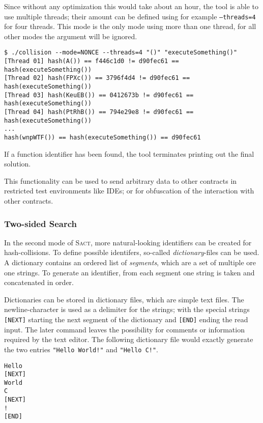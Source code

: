 Since without any optimization this would take about an hour, the tool is able to use multiple threads; their amount can be defined using for example \texttt{--threads=4} for four threads. This mode is the only mode using more than one thread, for all other modes the argument will be ignored.

\begin{verbatim}
$ ./collision --mode=NONCE --threads=4 "()" "executeSomething()"
[Thread 01] hash(A()) == f446c1d0 != d90fec61 == hash(executeSomething())
[Thread 02] hash(FPXc()) == 3796f4d4 != d90fec61 == hash(executeSomething())
[Thread 03] hash(KeuEB()) == 0412673b != d90fec61 == hash(executeSomething())
[Thread 04] hash(PtRhB()) == 794e29e8 != d90fec61 == hash(executeSomething())
...
hash(wnpWTF()) == hash(executeSomething()) == d90fec61
\end{verbatim}

If a function identifier has been found, the tool terminates printing out the final solution.

This functionality can be used to send arbitrary data to other contracts in restricted test environments like IDEs; or for obfuscation of the interaction with other contracts.

\subsubsection{Two-sided Search}
In the second mode of \textsc{Sact}, more natural-looking identifiers can be created for hash-collisions. To define possible identifers, so-called \textit{dictionary}-files can be used. A dictionary contains an ordered list of \textit{segments}, which are a set of multiple ore one strings. To generate an identifier, from each segment one string is taken and concatenated in order.

Dictionaries can be stored in dictionary files, which are simple text files. The newline-character is used as a delimiter for the strings; with the special strings \texttt{[NEXT]} starting the next segment of the dictionary and \texttt{[END]} ending the read input. The later command leaves the possibility for comments or information required by the text editor. The following dictionary file would exactly generate the two entries \texttt{"Hello World!"} and \texttt{"Hello C!"}.

\begin{verbatim}
Hello
[NEXT]
World
C
[NEXT]
!
[END]
\end{verbatim}

